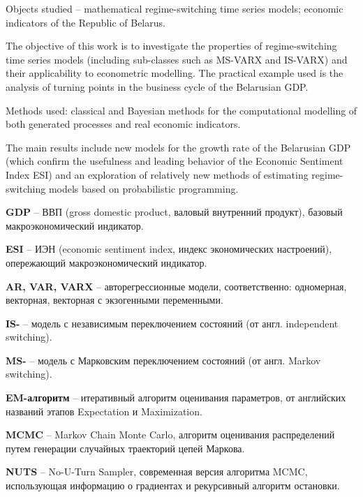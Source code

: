 \documentclass[a4paper,14pt]{extreport}
\begin{document}
Objects studied -- mathematical regime-switching time series models; economic indicators of the Republic of Belarus.

The objective of this work is to investigate the properties of regime-switching time series models (including sub-classes such as MS-VARX and IS-VARX) and their applicability to econometric modelling. The practical example used is the analysis of turning points in the business cycle of the Belarusian GDP.

Methods used: classical and Bayesian methods for the computational modelling of both generated processes and real economic indicators.

The main results include new models for the growth rate of the Belarusian GDP (which confirm the usefulness and leading behavior of the Economic Sentiment Index ESI) and an exploration of relatively new methods of estimating regime-switching models based on probabilistic programming.



\clearpage
\renewcommand{\contentsname}{Содержание}
\tableofcontents





\textbf{GDP} -- ВВП (gross domestic product, валовый внутренний продукт), базовый макроэкономический индикатор.

\textbf{ESI} -- ИЭН (economic sentiment index, индекс экономических настроений), опережающий макроэкономический индикатор.

\textbf{AR, VAR, VARX} -- авторегрессионные модели, соответственно: одномерная, векторная, векторная с экзогенными переменными.

\textbf{IS-} -- модель с независимым переключением состояний (от англ. independent switching).

\textbf{MS-} -- модель с Марковским переключением состояний (от англ. Markov switching).

\textbf{EM-алгоритм} -- итеративный алгоритм оценивания параметров, от английских названий этапов Expectation и Maximization.

\textbf{MCMC} -- Markov Chain Monte Carlo, алгоритм оценивания распределений путем генерации случайных траекторий цепей Маркова.

\textbf{NUTS} -- No-U-Turn Sampler, современная версия алгоритма MCMC, использующая информацию о градиентах и рекурсивный алгоритм остановки.
\end{document}
